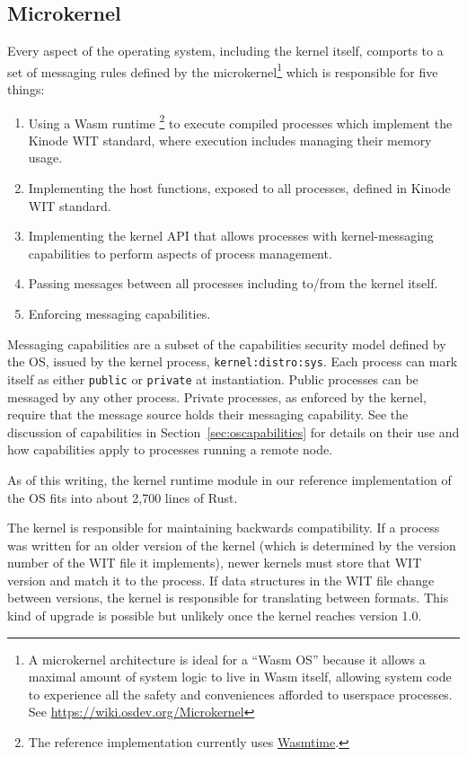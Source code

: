 \documentclass[runningheads]{llncs}
\begin{document}
\subsection{Microkernel}
\label{sec:osmicrokernel}

Every aspect of the operating system, including the kernel itself, comports to a set of messaging rules defined by the microkernel\footnote{A microkernel architecture is ideal for a ``Wasm OS'' because it allows a maximal amount of system logic to live in Wasm itself, allowing system code to experience all the safety and conveniences afforded to userspace processes. See \href{https://wiki.osdev.org/Microkernel}{https://wiki.osdev.org/Microkernel}} which is responsible for five things:
\begin{enumerate}
    \item Using a Wasm runtime
    \footnote{The reference implementation currently uses \href{https://wasmtime.dev}{Wasmtime}.}
    to execute compiled processes which implement the Kinode WIT standard, where execution includes managing their memory usage.
    \item Implementing the host functions, exposed to all processes, defined in Kinode WIT standard.
    \item Implementing the kernel API that allows processes with kernel-messaging capabilities to perform aspects of process management.
    \item Passing messages between all processes including to/from the kernel itself.
    \item Enforcing messaging capabilities.
\end{enumerate}

Messaging capabilities are a subset of the capabilities security model defined by the OS, issued by the kernel process, \verb|kernel:distro:sys|.
Each process can mark itself as either \verb|public| or \verb|private| at instantiation.
Public processes can be messaged by any other process.
Private processes, as enforced by the kernel, require that the message source holds their messaging capability.
See the discussion of capabilities in Section~\ref{sec:oscapabilities} for details on their use and how capabilities apply to processes running a remote node.

As of this writing, the kernel runtime module in our reference implementation of the OS fits into about 2,700 lines of Rust.

The kernel is responsible for maintaining backwards compatibility.
If a process was written for an older version of the kernel (which is determined by the version number of the WIT file it implements), newer kernels must store that WIT version and match it to the process.
If data structures in the WIT file change between versions, the kernel is responsible for translating between formats.
This kind of upgrade is possible but unlikely once the kernel reaches version 1.0.
\end{document}
